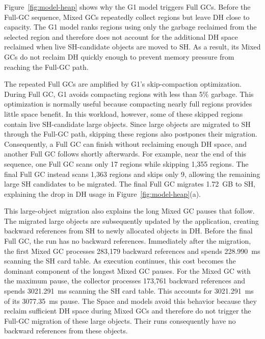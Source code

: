 Figure~\ref{fig:model-heap} shows why the G1 model triggers Full GCs.
Before the Full-GC sequence, Mixed GCs repeatedly collect regions but leave DH close to capacity.
The G1 model ranks regions using only the garbage reclaimed from the selected region and therefore does not account for the additional DH space reclaimed when live SH-candidate objects are moved to SH.
As a result, its Mixed GCs do not reclaim DH quickly enough to prevent memory pressure from reaching the Full-GC path.

The repeated Full GCs are amplified by G1's skip-compaction optimization.
During Full GC, G1 avoids compacting regions with less than 5\% garbage.
This optimization is normally useful because compacting nearly full regions provides little space benefit.
In this workload, however, some of these skipped regions contain live SH-candidate large objects.
Since large objects are migrated to SH through the Full-GC path, skipping these regions also postpones their migration.
Consequently, a Full GC can finish without reclaiming enough DH space, and another Full GC follows shortly afterwards.
For example, near the end of this sequence, one Full GC scans only 17 regions while skipping 1,355 regions.
The final Full GC instead scans 1,363 regions and skips only 9, allowing the remaining large SH candidates to be migrated.
The final Full GC migrates \SI{1.72}{GB} to SH, explaining the drop in DH usage in Figure~\ref{fig:model-heap}(a).

This large-object migration also explains the long Mixed GC pauses that follow.
The migrated large objects are subsequently updated by the application, creating backward references from SH to newly allocated objects in DH.
Before the final Full GC, the run has no backward references.
Immediately after the migration, the first Mixed GC processes 283,179 backward references and spends \SI{228.990}{ms} scanning the SH card table.
As execution continues, this cost becomes the dominant component of the longest Mixed GC pauses.
For the Mixed GC with the maximum pause, the collector processes 173,761 backward references and spends \SI{3021.291}{ms} scanning the SH card table.
This accounts for \SI{3021.291}{ms} of its \SI{3077.35}{ms} pause.
The Space and \chipperName{} models avoid this behavior because they reclaim sufficient DH space during Mixed GCs and therefore do not trigger the Full-GC migration of these large objects.
Their runs consequently have no backward references from these objects.

